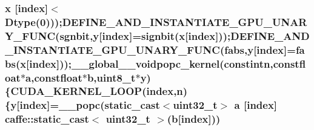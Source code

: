 \hypertarget{namespacecaffe_a91eff1fdaaf60428c47eae6950deffb1}{
\subsubsection[{static\+\_\+cast$<$ uint32\+\_\+t $>$}]{\setlength{\rightskip}{0pt plus 5cm}x \mbox{[}index\mbox{]}$<$Dtype(0)));{\bf D\+E\+F\+I\+N\+E\+\_\+\+A\+N\+D\+\_\+\+I\+N\+S\+T\+A\+N\+T\+I\+A\+T\+E\+\_\+\+G\+P\+U\+\_\+\+U\+N\+A\+R\+Y\+\_\+\+F\+U\+N\+C}(sgnbit,y\mbox{[}index\mbox{]}=signbit(x\mbox{[}index\mbox{]}));{\bf D\+E\+F\+I\+N\+E\+\_\+\+A\+N\+D\+\_\+\+I\+N\+S\+T\+A\+N\+T\+I\+A\+T\+E\+\_\+\+G\+P\+U\+\_\+\+U\+N\+A\+R\+Y\+\_\+\+F\+U\+N\+C}(fabs,y\mbox{[}index\mbox{]}=fabs(x\mbox{[}index\mbox{]}));\+\_\+\+\_\+global\+\_\+\+\_\+voidpopc\+\_\+kernel(constintn,constfloat$\ast$a,constfloat$\ast$b,uint8\+\_\+t$\ast$y)\{{\bf C\+U\+D\+A\+\_\+\+K\+E\+R\+N\+E\+L\+\_\+\+L\+O\+O\+P}(index,n)\{y\mbox{[}index\mbox{]}=\+\_\+\+\_\+popc(static\+\_\+cast$<$uint32\+\_\+t$>$ a \mbox{[}index\mbox{]} caffe\+::static\+\_\+cast$<$ uint32\+\_\+t $>$(b\mbox{[}index\mbox{]}))}}\label{namespacecaffe_a91eff1fdaaf60428c47eae6950deffb1}
